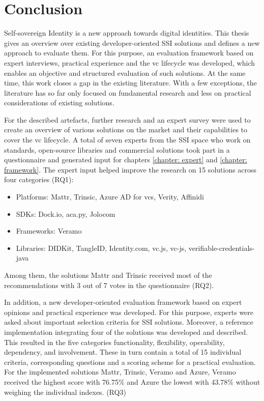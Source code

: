\chapter{Conclusion}


Self-sovereign Identity is a new approach towards digital identities. This thesis gives an overview over existing developer-oriented \ac{SSI} solutions and defines a new approach to evaluate them. For this purpose, an evaluation framework based on expert interviews, practical experience and the \ac{vc} lifecycle was developed, which enables an objective and structured evaluation of such solutions. At the same time, this work closes a gap in the existing literature. With a few exceptions, the literature has so far only focused on fundamental research and less on practical considerations of existing solutions.

For the described artefacts, further research and an expert survey were used to create an overview of various solutions on the market and their capabilities to cover the \ac{vc} lifecycle. A total of seven experts from the \ac{SSI} space who work on standards, open-source libraries and commercial solutions took part in a questionnaire and generated input for chapters \ref{chapter: expert} and \ref{chapter: framework}.
The expert input helped improve the research on 15 solutions across four categories (RQ1):
\begin{itemize}
    \item Platforms: Mattr, Trinsic, Azure AD for \acp{vc}, Verity, Affinidi
    \item SDKs: Dock.io, aca.py, Jolocom
    \item Frameworks: Veramo
    \item Libraries:  DIDKit, TangleID, Identity.com, vc.js, vc-js, verifiable-credentials-java
\end{itemize}
Among them, the solutions Mattr and Trinsic received most of the recommendations with 3 out of 7 votes in the questionnaire (RQ2).

In addition, a new developer-oriented evaluation framework based on expert opinions and practical experience was developed. For this purpose, experts were asked about important selection criteria for \ac{SSI} solutions. Moreover, a reference implementation integrating four of the solutions was developed and described. This resulted in the five categories functionality, flexibility, operability, dependency, and involvement. These in turn contain a total of 15 individual criteria, corresponding questions and a scoring scheme for a practical evaluation. For the implemented solutions Mattr, Trinsic, Veramo and Azure, Veramo received the highest score with 76.75\% and Azure the lowest with 43.78\% without weighing the individual indexes. (RQ3)

